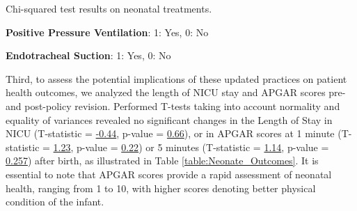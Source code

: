\documentclass[11pt]{article}
\begin{document}
\begin{table}[h]
\caption{\protect\hyperlink{file-table-1-pkl}{Impact of change in treatment policy on neonatal treatments.}}
\label{table:Neonate_Treatments}
\begin{threeparttable}
\renewcommand{\TPTminimum}{\linewidth}
\begin{tablenotes}
\footnotesize
\item Chi-squared test results on neonatal treatments.
\item \textbf{Positive Pressure Ventilation}: 1: Yes, 0: No
\item \textbf{Endotracheal Suction}: 1: Yes, 0: No
\end{tablenotes}
\end{threeparttable}
\end{table}


Third, to assess the potential implications of these updated practices on patient health outcomes, we analyzed the length of NICU stay and APGAR scores pre- and post-policy revision. Performed T-tests taking into account normality and equality of variances revealed no significant changes in the Length of Stay in NICU (T-statistic = \hyperlink{C0a}{-0.44}, p-value = \hyperlink{C0b}{0.66}), or in APGAR scores at 1 minute (T-statistic = \hyperlink{C1a}{1.23}, p-value = \hyperlink{C1b}{0.22}) or 5 minutes (T-statistic = \hyperlink{C2a}{1.14}, p-value = \hyperlink{C2b}{0.257}) after birth, as illustrated in Table {}\ref{table:Neonate_Outcomes}. It is essential to note that APGAR scores provide a rapid assessment of neonatal health, ranging from 1 to 10, with higher scores denoting better physical condition of the infant.
\end{document}
